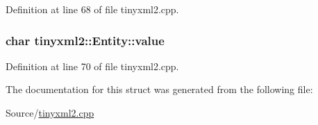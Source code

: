 Definition at line 68 of file tinyxml2.\-cpp.

\hypertarget{structtinyxml2_1_1_entity_a7334e81e33b4615655a403711b24f3ed}{
\subsubsection[{value}]{\setlength{\rightskip}{0pt plus 5cm}char tinyxml2\-::\-Entity\-::value}}\label{structtinyxml2_1_1_entity_a7334e81e33b4615655a403711b24f3ed}


Definition at line 70 of file tinyxml2.\-cpp.



The documentation for this struct was generated from the following file\-:\begin{DoxyCompactItemize}
\item 
Source/\hyperlink{tinyxml2_8cpp}{tinyxml2.\-cpp}\end{DoxyCompactItemize}
